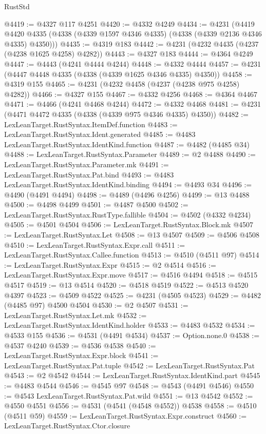 \begin{lexlean}{RustStd}
\begin{coremodule}
@4419 := @4327 @117 @4251
@4420 := @4332 @4249
@4434 := @4231
    (@4419 @4420 @4335 (@4338 (@4339 @1597 @4346 @4335) (@4338 (@4339 @2136 @4346 @4335) @4350)))
@4435 := @4319 @183
@4442 := @4231 (@4232 @4435 (@4237 (@4238 @1625 @4258) @4282))
@4443 := @4327 @183
@4444 := @4364 @4249
@4447 := @4443 (@4241 @4444 @4244)
@4448 := @4332 @4444
@4457 := @4231 (@4447 @4448 @4335 (@4338 (@4339 @1625 @4346 @4335) @4350))
@4458 := @4319 @155
@4465 := @4231 (@4232 @4458 (@4237 (@4238 @975 @4258) @4282))
@4466 := @4327 @155
@4467 := @4332 @4256
@4468 := @4364 @4467
@4471 := @4466 (@4241 @4468 @4244)
@4472 := @4332 @4468
@4481 := @4231 (@4471 @4472 @4335 (@4338 (@4339 @975 @4346 @4335) @4350))
@4482 := LexLeanTarget.RustSyntax.ItemDef.function
@4483 := LexLeanTarget.RustSyntax.Ident.generated
@4485 := @4483 LexLeanTarget.RustSyntax.IdentKind.function
@4487 := @4482 (@4485 @34)
@4488 := LexLeanTarget.RustSyntax.Parameter
@4489 := @2 @4488
@4490 := LexLeanTarget.RustSyntax.Parameter.mk
@4491 := LexLeanTarget.RustSyntax.Pat.bind
@4493 := @4483 LexLeanTarget.RustSyntax.IdentKind.binding
@4494 := @4493 @34
@4496 := @4490 (@4491 @4494)
@4498 := @4489 (@4496 @4256)
@4499 := @13 @4488
@4500 := @4498 @4499
@4501 := @4487 @4500
@4502 := LexLeanTarget.RustSyntax.RustType.fallible
@4504 := @4502 (@4332 @4234)
@4505 := @4501 @4504
@4506 := LexLeanTarget.RustSyntax.Block.mk
@4507 := LexLeanTarget.RustSyntax.Let
@4508 := @13 @4507
@4509 := @4506 @4508
@4510 := LexLeanTarget.RustSyntax.Expr.call
@4511 := LexLeanTarget.RustSyntax.Callee.function
@4513 := @4510 (@4511 @97)
@4514 := LexLeanTarget.RustSyntax.Expr
@4515 := @2 @4514
@4516 := LexLeanTarget.RustSyntax.Expr.move
@4517 := @4516 @4494
@4518 := @4515 @4517
@4519 := @13 @4514
@4520 := @4518 @4519
@4522 := @4513 @4520 @4397
@4523 := @4509 @4522
@4525 := @4231 (@4505 @4523)
@4529 := @4482 (@4485 @97) @4500 @4504
@4530 := @2 @4507
@4531 := LexLeanTarget.RustSyntax.Let.mk
@4532 := LexLeanTarget.RustSyntax.IdentKind.holder
@4533 := @4483 @4532
@4534 := @4533 @155
@4536 := @4531 (@4491 @4534)
@4537 := Option.none.{0}
@4538 := @4537 @4240
@4539 := @4536 @4538
@4540 := LexLeanTarget.RustSyntax.Expr.block
@4541 := LexLeanTarget.RustSyntax.Pat.tuple
@4542 := LexLeanTarget.RustSyntax.Pat
@4543 := @2 @4542
@4544 := LexLeanTarget.RustSyntax.IdentKind.part
@4545 := @4483 @4544
@4546 := @4545 @97
@4548 := @4543 (@4491 @4546)
@4550 := @4543 LexLeanTarget.RustSyntax.Pat.wild
@4551 := @13 @4542
@4552 := @4550 @4551
@4556 := @4531 (@4541 (@4548 @4552)) @4538
@4558 := @4510 (@4511 @59)
@4559 := LexLeanTarget.RustSyntax.Expr.construct
@4560 := LexLeanTarget.RustSyntax.Ctor.closure

\end{coremodule}
\end{lexlean}
